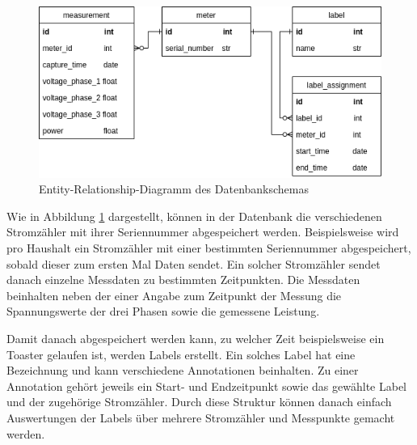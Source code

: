 \begin{figure}[H]
    \centering
    \includegraphics[width=1.0\textwidth]{gfx/smic-db}
    \caption{
        Entity-Relationship-Diagramm des Datenbankschemas
    }
    \label{fig:smic-db}
\end{figure}

Wie in Abbildung \ref{fig:smic-db} dargestellt, können in der Datenbank
die verschiedenen Stromzähler mit ihrer Seriennummer abgespeichert werden.
Beispielsweise wird pro Haushalt ein Stromzähler mit einer bestimmten
Seriennummer abgespeichert, sobald dieser zum ersten Mal Daten sendet.
Ein solcher Stromzähler sendet danach einzelne Messdaten zu bestimmten
Zeitpunkten. Die Messdaten beinhalten neben der einer Angabe zum Zeitpunkt der Messung die Spannungswerte der drei Phasen
sowie die gemessene Leistung.

Damit danach abgespeichert werden kann, zu welcher Zeit beispielsweise ein
Toaster gelaufen ist, werden Labels erstellt. Ein solches Label hat eine
Bezeichnung und kann verschiedene Annotationen beinhalten.
Zu einer Annotation gehört jeweils ein Start- und Endzeitpunkt sowie das gewählte Label und der zugehörige Stromzähler.
Durch diese Struktur können danach einfach Auswertungen der Labels über mehrere
Stromzähler und Messpunkte gemacht werden.


